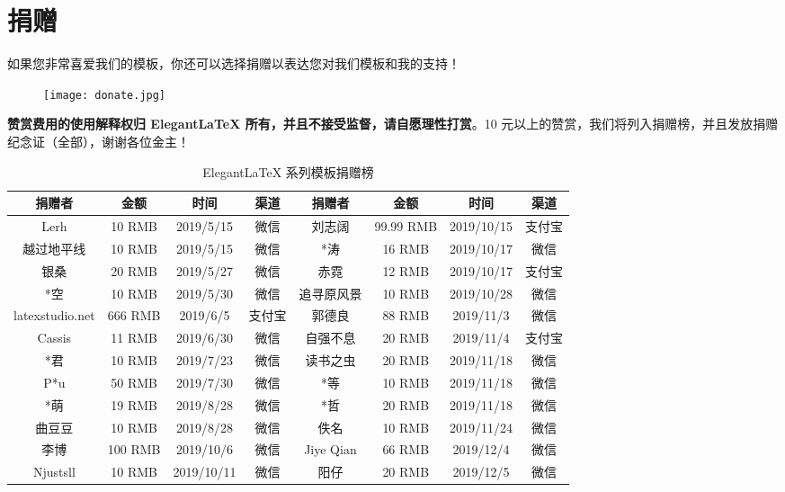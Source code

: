 \documentclass[cn,hazy,blue,screen,14pt]{elegantnote}
\begin{document}
\section{捐赠}

如果您非常喜爱我们的模板，你还可以选择捐赠以表达您对我们模板和我的支持！

\begin{figure}[htbp]
  \centering
  \texttt{[image: donate.jpg]}
\end{figure}

\textbf{赞赏费用的使用解释权归 Elegant\LaTeX{} 所有，并且不接受监督，请自愿理性打赏}。10 元以上的赞赏，我们将列入捐赠榜，并且发放捐赠纪念证（全部），谢谢各位金主！

\begin{table}[htbp]
  \small
  \centering
  \caption{Elegant\LaTeX{} 系列模板捐赠榜}
    \begin{tabular}{cccccccc}
    \toprule
    \textbf{捐赠者} & \textbf{金额} & \textbf{时间} & \textbf{渠道} & \textbf{捐赠者} & \textbf{金额} & \textbf{时间} & \textbf{渠道} \\
    \midrule
    Lerh  & 10 RMB & 2019/5/15 & 微信    & 刘志阔   & 99.99 RMB & 2019/10/15 & 支付宝 \\
    越过地平线 & 10 RMB & 2019/5/15 & 微信    & *涛    & 16 RMB & 2019/10/17 & 微信 \\
    银桑    & 20 RMB & 2019/5/27 & 微信    & 赤霓    & 12 RMB & 2019/10/17 & 支付宝 \\
    *空    & 10 RMB & 2019/5/30 & 微信    & 追寻原风景 & 10 RMB & 2019/10/28 & 微信 \\
    latexstudio.net & 666 RMB & 2019/6/5 & 支付宝   & 郭德良   & 88 RMB & 2019/11/3 & 微信 \\
    Cassis & 11 RMB & 2019/6/30 & 微信    & 自强不息  & 20 RMB & 2019/11/4 & 支付宝 \\
    *君    & 10 RMB & 2019/7/23 & 微信    & 读书之虫  & 20 RMB & 2019/11/18 & 微信 \\
    P*u   & 50 RMB & 2019/7/30 & 微信    & *等    & 10 RMB & 2019/11/18 & 微信 \\
    *萌    & 19 RMB & 2019/8/28 & 微信    & *哲    & 20 RMB & 2019/11/18 & 微信 \\
    曲豆豆   & 10 RMB & 2019/8/28 & 微信    & 佚名    & 10 RMB & 2019/11/24 & 微信 \\
    李博    & 100 RMB & 2019/10/6 & 微信    & Jiye Qian & 66 RMB & 2019/12/4 & 微信 \\
    Njustsll & 10 RMB & 2019/10/11 & 微信    & 阳仔    & 20 RMB & 2019/12/5 & 微信 \\
    \bottomrule
    \end{tabular}%
  \label{tab:donation}%
\end{table}%
\end{document}
